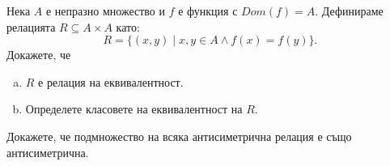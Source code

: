 \begin{problem}
  Нека $A$ е непразно множество и $f$ е функция с $Dom(f) = A$.
  Дефинираме релацията $R\subseteq A\times A$ като:
  \[R = \{(x,y)\mid x,y\in A\wedge f(x) = f(y)\}.\]
  Докажете, че
  \begin{enumerate}[a)]
  \item
    $R$ е релация на еквивалентност.
  \item
    Определете класовете на еквивалентност на $R$.
\end{enumerate}
\end{problem}

\begin{problem}
  Докажете, че подмножество на всяка антисиметрична релация е също антисиметрична.
\end{problem}





